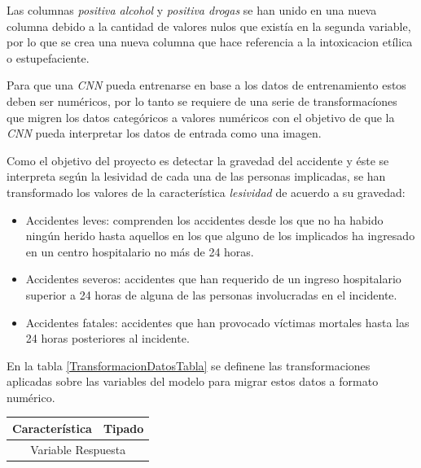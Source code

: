 \begin{enumerate}
\begin{enumerate}
                    Las columnas \textit{positiva alcohol} y \textit{positiva drogas} se han unido en una nueva columna debido a la cantidad de valores nulos que existía en la segunda variable, por lo que se crea una nueva columna que hace referencia a la intoxicacion etílica o estupefaciente.

                    Para que una \textit{CNN} pueda entrenarse en base a los datos de entrenamiento estos deben ser numéricos, por lo tanto se requiere de una serie de transformacíones que migren los datos categóricos a valores numéricos con el objetivo de que la \textit{CNN} pueda interpretar los datos de entrada como una imagen.

                    Como el objetivo del proyecto es detectar la gravedad del accidente y éste se interpreta según la lesividad de cada una de las personas implicadas, se han transformado los valores de la característica \textit{lesividad} de acuerdo a su gravedad:

                    \begin{itemize}
                        \item Accidentes leves: comprenden los accidentes desde los que no ha habido ningún herido hasta aquellos en los que alguno de los implicados ha ingresado en un centro hospitalario no más de 24 horas.
                        \item Accidentes severos: accidentes que han requerido de un ingreso hospitalario superior a 24 horas de alguna de las personas involucradas en el incidente.
                        \item Accidentes fatales: accidentes que han provocado víctimas mortales hasta las 24 horas posteriores al incidente.
                    \end{itemize}

                    En la tabla \ref{TransformacionDatosTabla} se definene las transformaciones aplicadas sobre las variables del modelo para migrar estos datos a formato numérico.



                    \begin{table}[ht]
                      \centering
                      \begin{tabular}{ll}
                           \toprule
                           \textbf{Característica} & \textbf{Tipado}\\
                           \midrule
                           \midrule
                           \multicolumn{2}{c}{Variable Respuesta}\\
                           \midrule


\end{tabular}
\end{table}
\end{enumerate}
\end{enumerate}
